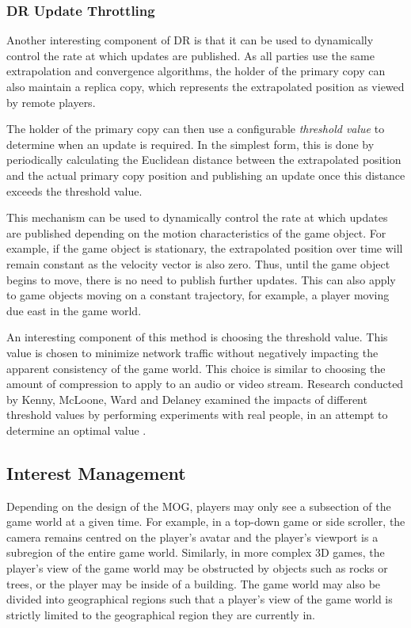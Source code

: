 \subsubsection{DR Update Throttling}
Another interesting component of DR is that it can be used to dynamically control the rate at which updates are published. As all parties use the same extrapolation and convergence algorithms, the holder of the primary copy can also maintain a replica copy, which represents the extrapolated position as viewed by remote players. 

The holder of the primary copy can then use a configurable \textit{threshold value} to determine when an update is required. In the simplest form, this is done by periodically calculating the Euclidean distance between the extrapolated position and the actual primary copy position and publishing an update once this distance exceeds the threshold value. 

This mechanism can be used to dynamically control the rate at which updates are published depending on the motion characteristics of the game object. For example, if the game object is stationary, the extrapolated position over time will remain constant as the velocity vector is also zero. Thus, until the game object begins to move, there is no need to publish further updates. This can also apply to game objects moving on a constant trajectory, for example, a player moving due east in the game world. 

An interesting component of this method is choosing the threshold value. This value is chosen to minimize network traffic without negatively impacting the apparent consistency of the game world. This choice is similar to choosing the amount of compression to apply to an audio or video stream. Research conducted by Kenny, McLoone, Ward and Delaney examined the impacts of different threshold values by performing experiments with real people, in an attempt to determine an optimal value \cite{dead-reckonining-threshold-learning}. 



\subsection{Interest Management}\label{sec:interest-management}
Depending on the design of the MOG, players may only see a subsection of the game world at a given time. For example, in a top-down game or side scroller, the camera remains centred on the player's avatar and the player's viewport is a subregion of the entire game world. Similarly, in more complex 3D games, the player's view of the game world may be obstructed by objects such as rocks or trees, or the player may be inside of a building. The game world may also be divided into geographical regions such that a player's view of the game world is strictly limited to the geographical region they are currently in.

